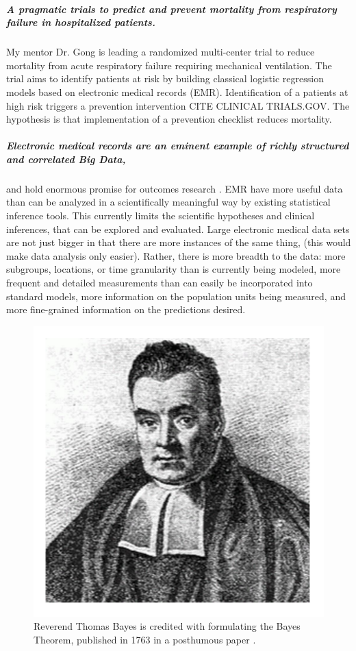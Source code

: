 \documentclass[11pt,notitlepage]{article}
\begin{document}
\subparagraph{A pragmatic trials to predict and prevent mortality from respiratory failure in hospitalized patients.} My mentor Dr. Gong is leading a randomized multi-center trial to reduce mortality from acute respiratory failure requiring mechanical ventilation. The trial aims to identify patients at risk by building classical logistic regression models based on electronic medical records (EMR). Identification of a patients at high risk triggers a prevention intervention CITE CLINICAL TRIALS.GOV. The hypothesis is that implementation of a prevention checklist reduces mortality. 

\subparagraph{Electronic medical records are an eminent example of richly structured and correlated Big Data,} 
and hold enormous promise for outcomes research \cite{Dean_19279318,Amarasingham20940649}. EMR have more useful data than can be analyzed in a scientifically meaningful way by existing statistical inference tools. This currently limits the scientific hypotheses and clinical inferences, that can be explored and evaluated. Large electronic medical data sets are not just bigger in that there are more instances of the same thing, (this would make data analysis only easier). Rather, there is more breadth to the data: more subgroups, locations, or time granularity than is currently being modeled, more frequent and detailed measurements than can easily be incorporated into standard models, more information on the population units being measured, and more fine-grained information on the predictions desired. 


\begin{figure} %
\includegraphics[scale=0.15]{Figures/Thomas_Bayes.pdf}
\caption{\footnotesize Reverend Thomas Bayes is credited with formulating the Bayes Theorem, published in 1763 in a posthumous paper  \cite{Thomas_Bayes}.}
\end{figure}
\end{document}
